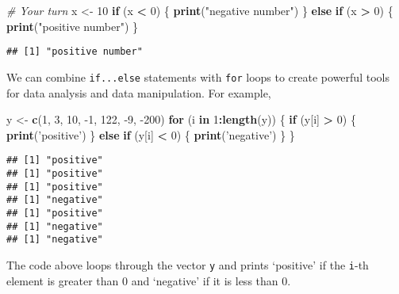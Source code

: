 \documentclass[
]{article}
\newenvironment{Shaded}{\begin{snugshade}}{\end{snugshade}}
\newcommand{\CommentTok}[1]{\textcolor[rgb]{0.56,0.35,0.01}{\textit{#1}}}
\newcommand{\ControlFlowTok}[1]{\textcolor[rgb]{0.13,0.29,0.53}{\textbf{#1}}}
\newcommand{\DecValTok}[1]{\textcolor[rgb]{0.00,0.00,0.81}{#1}}
\newcommand{\KeywordTok}[1]{\textcolor[rgb]{0.13,0.29,0.53}{\textbf{#1}}}
\newcommand{\NormalTok}[1]{#1}
\newcommand{\OperatorTok}[1]{\textcolor[rgb]{0.81,0.36,0.00}{\textbf{#1}}}
\newcommand{\StringTok}[1]{\textcolor[rgb]{0.31,0.60,0.02}{#1}}
\begin{document}
\begin{Shaded}
\begin{Highlighting}[]
\CommentTok{# Your turn}
\NormalTok{x <-}\StringTok{ }\DecValTok{10}
\ControlFlowTok{if}\NormalTok{ (x }\OperatorTok{<}\StringTok{ }\DecValTok{0}\NormalTok{) \{}
   \KeywordTok{print}\NormalTok{(}\StringTok{"negative number"}\NormalTok{)}
\NormalTok{\} }\ControlFlowTok{else} \ControlFlowTok{if}\NormalTok{ (x }\OperatorTok{>}\StringTok{ }\DecValTok{0}\NormalTok{) \{}
  \KeywordTok{print}\NormalTok{(}\StringTok{"positive number"}\NormalTok{)}
\NormalTok{\}}
\end{Highlighting}
\end{Shaded}

\begin{verbatim}
## [1] "positive number"
\end{verbatim}

We can combine \texttt{if...else} statements with \texttt{for} loops to
create powerful tools for data analysis and data manipulation. For
example,

\begin{Shaded}
\begin{Highlighting}[]
\NormalTok{y <-}\StringTok{ }\KeywordTok{c}\NormalTok{(}\DecValTok{1}\NormalTok{, }\DecValTok{3}\NormalTok{, }\DecValTok{10}\NormalTok{, }\DecValTok{-1}\NormalTok{, }\DecValTok{122}\NormalTok{, }\DecValTok{-9}\NormalTok{, }\DecValTok{-200}\NormalTok{)}
\ControlFlowTok{for}\NormalTok{ (i }\ControlFlowTok{in} \DecValTok{1}\OperatorTok{:}\KeywordTok{length}\NormalTok{(y)) \{}
  \ControlFlowTok{if}\NormalTok{ (y[i] }\OperatorTok{>}\StringTok{ }\DecValTok{0}\NormalTok{) \{}
  \KeywordTok{print}\NormalTok{(}\StringTok{'positive'}\NormalTok{)}
\NormalTok{  \} }
  \ControlFlowTok{else} \ControlFlowTok{if}\NormalTok{ (y[i] }\OperatorTok{<}\StringTok{ }\DecValTok{0}\NormalTok{) \{}
  \KeywordTok{print}\NormalTok{(}\StringTok{'negative'}\NormalTok{)}
\NormalTok{  \}}
\NormalTok{\}}
\end{Highlighting}
\end{Shaded}

\begin{verbatim}
## [1] "positive"
## [1] "positive"
## [1] "positive"
## [1] "negative"
## [1] "positive"
## [1] "negative"
## [1] "negative"
\end{verbatim}

The code above loops through the vector \texttt{y} and prints `positive'
if the \texttt{i}-th element is greater than 0 and `negative' if it is
less than 0.
\end{document}
